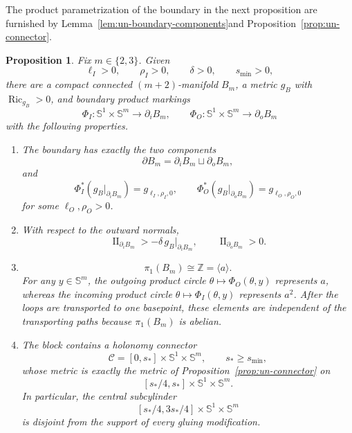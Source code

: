 \documentclass[11pt,reqno]{amsart}
\newtheorem{proposition}[theorem]{Proposition}
\theoremstyle{definition}
\numberwithin{equation}{section}
\DeclareMathOperator{\Ric}{Ric}
\DeclareMathOperator{\II}{II}
\begin{document}
The product parametrization of the boundary in the next proposition are furnished by
Lemma~\ref{lem:un-boundary-components}\hspace{0.25em}and
Proposition~\ref{prop:un-connector}.

\begin{proposition}
\label{prop:square-root-block}
Fix \(m\in\{2,3\}\).  Given
\[
 \ell_I>0,\qquad \rho_I>0,\qquad \delta>0,
 \qquad s_{\min}>0,
\]
there are a compact connected \((m+2)\)-manifold \(B_m\), a metric
\(g_B\) with \(\Ric_{g_B}>0\), and boundary product markings
\[
 \Phi_I:\mathbb S^1\times\mathbb S^m\longrightarrow\partial_iB_m,
 \qquad
 \Phi_O:\mathbb S^1\times\mathbb S^m\longrightarrow\partial_oB_m
\]
with the following properties.

\begin{enumerate}[label=\textup{(\roman*)}]
\item The boundary has exactly the two components
\[
 \partial B_m=\partial_iB_m\sqcup\partial_oB_m,
\]
and
\[
 \Phi_I^*(g_B|_{\partial_iB_m})=g_{\ell_I,\rho_I,0},
 \qquad
 \Phi_O^*(g_B|_{\partial_oB_m})=g_{\ell_O,\rho_O,0}
\]
for some \(\ell_O,\rho_O>0\).

\item With respect to the outward normals,
\[
 \II_{\partial_iB_m}>-\delta\,g_B|_{\partial_iB_m},
 \qquad
 \II_{\partial_oB_m}>0.
\]

\item
\[
 \pi_1(B_m)\cong\mathbb Z=\langle a\rangle.
\]
For any \(y\in\mathbb S^m\), the outgoing product circle
\(\theta\mapsto\Phi_O(\theta,y)\) represents \(a\), whereas the incoming
product circle \(\theta\mapsto\Phi_I(\theta,y)\) represents \(a^2\).
After the loops are transported to one basepoint, these elements are
independent of the transporting paths because \(\pi_1(B_m)\) is
abelian.

\item The block contains a holonomy connector
\[
 \mathcal C=[0,s_*]\times\mathbb S^1\times\mathbb S^m,
 \qquad s_*\ge s_{\min},
\]
whose metric is exactly the metric of
Proposition~\ref{prop:un-connector} on
\[
 [s_*/4,s_*]\times\mathbb S^1\times\mathbb S^m.
\]
In particular, the central subcylinder
\begin{equation}\label{def: central-subcylinder}
 [s_*/4,3s_*/4]\times\mathbb S^1\times\mathbb S^m
\end{equation}
is disjoint from the support of every gluing modification.
\end{enumerate}
\end{proposition}
\end{document}
